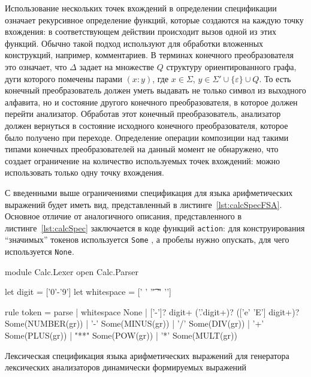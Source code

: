 \documentclass[10pt, conference, compsocconf]{IEEEtran}
\begin{document}
Использование нескольких точек вхождений в определении спецификации означает рекурсивное определение функций, которые создаются на каждую точку вхождения: в соответствующем действии происходит вызов одной из этих функций. Обычно такой подход используют для обработки вложенных конструкций, например, комментариев. В терминах конечного преобразователя это означает, что $\Delta$ задает на множестве $Q$ структуру ориентированного графа, дуги которого помечены парами $(x : y)$, где $x \in \Sigma$, $y \in \Sigma' \cup \{\varepsilon \} \cup Q$.  То есть конечный преобразователь должен уметь выдавать не только символ из выходного алфавита, но и состояние другого конечного преобразователя, в которое должен перейти анализатор. Обработав этот конечный преобразователь, анализатор должен вернуться в состояние исходного конечного преобразователя, которое было получено при переходе.  Определение операции композиции над такими типами конечных преобразователей на данный момент не обнаружено, что создает ограничение на количество используемых точек вхождений: можно использовать только одну точку вхождения.  
% 
% 

С введенными выше ограничениями  спецификация для языка арифметических выражений будет иметь вид, представленный в листинге~\ref{lst:calcSpecFSA}. Основное отличие от аналогичного описания, представленного в листинге~\ref{lst:calcSpec} заключается в коде функций \verb|action|: для конструирования ``значимых'' токенов используется \verb|Some| , а пробелы нужно опускать, для чего используется \verb|None|.


\begin{listing}[h]
\begin{pyglist}[language=ocaml,numbers=none,numbersep=5pt]
{
module Calc.Lexer
open Calc.Parser
}

let digit = ['0'-'9']
let whitespace = [' ' '\t' '\r' '\n']

rule token = parse
| whitespace { None }
| ['-']? digit+ ('.'digit+)? (['e' 'E'] digit+)? 
       { Some(NUMBER(gr)) }
| '-'  { Some(MINUS(gr)) }
| '/'  { Some(DIV(gr)) }
| '+'  { Some(PLUS(gr)) }
| "**" { Some(POW(gr)) }
| '*'  { Some(MULT(gr)) }
\end{pyglist}
\caption{Лексическая спецификация языка арифметических выражений для генератора лексических анализаторов динамически формируемых выражений}
\label{lst:calcSpecFSA}
\end{listing}
\end{document}

